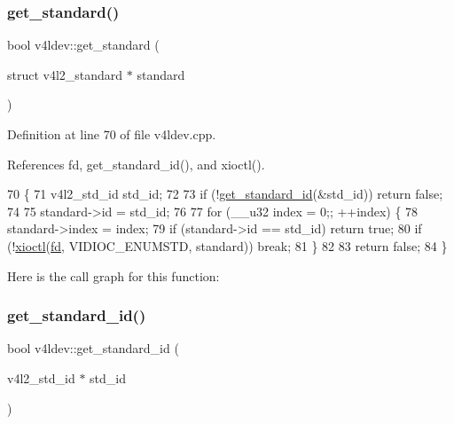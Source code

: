 \subsubsection{\texorpdfstring{get\+\_\+standard()}{get\_standard()}}
{\footnotesize\ttfamily bool v4ldev\+::get\+\_\+standard (\begin{DoxyParamCaption}\item[{struct v4l2\+\_\+standard $\ast$}]{standard }\end{DoxyParamCaption})}



Definition at line 70 of file v4ldev.\+cpp.



References fd, get\+\_\+standard\+\_\+id(), and xioctl().


\begin{DoxyCode}
70                                                          \{
71     v4l2\_std\_id std\_id;
72 
73     \textcolor{keywordflow}{if} (!\hyperlink{classv4ldev_a4d296d91d189e8600e298771ae5016b2}{get\_standard\_id}(&std\_id)) \textcolor{keywordflow}{return} \textcolor{keyword}{false};
74 
75     standard->id = std\_id;
76 
77     \textcolor{keywordflow}{for} (\_\_u32 index = 0;; ++index) \{
78         standard->index = index;
79         \textcolor{keywordflow}{if} (standard->id == std\_id) \textcolor{keywordflow}{return} \textcolor{keyword}{true};
80         \textcolor{keywordflow}{if} (!\hyperlink{classv4ldev_ab93cb1ab18254ca362310b006bd2552d}{xioctl}(\hyperlink{classv4ldev_a2cd44be3be75a19ab8bec12b28e29142}{fd}, VIDIOC\_ENUMSTD, standard)) \textcolor{keywordflow}{break};
81     \}
82     
83     \textcolor{keywordflow}{return} \textcolor{keyword}{false};
84 \}
\end{DoxyCode}
Here is the call graph for this function\+:
\mbox{\label{classv4ldev_a4d296d91d189e8600e298771ae5016b2}} 
\subsubsection{\texorpdfstring{get\+\_\+standard\+\_\+id()}{get\_standard\_id()}}
{\footnotesize\ttfamily bool v4ldev\+::get\+\_\+standard\+\_\+id (\begin{DoxyParamCaption}\item[{v4l2\+\_\+std\+\_\+id $\ast$}]{std\+\_\+id }\end{DoxyParamCaption})}



